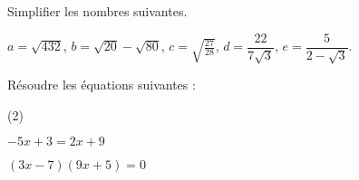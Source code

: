 %
%
%
\begin{mth} Simplifier les nombres suivantes.

$a=\sqrt{432}$, \hfill
$b=\sqrt{20}-\sqrt{80}$, \hfill
$c=\sqrt{\frac{27}{28}}$, \hfill
$d=\dfrac{22}{7\sqrt{3}}$, \hfill
$e=\dfrac{5}{2-\sqrt3}$.
\end{mth}
%
%
\begin{mth}
Résoudre les équations suivantes : 
    \begin{enumerate-}(2)
    \item $-5x+3=2x+9$
    \item $(3x-7)(9x+5)=0$
    \end{enumerate-}
\end{mth}

